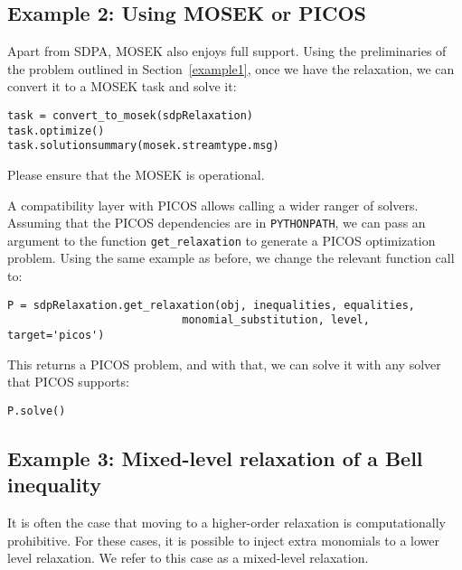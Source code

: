 \documentclass{article}
\begin{document}
\subsection{Example 2: Using MOSEK or PICOS}
Apart from SDPA, MOSEK also enjoys full support. Using the preliminaries of the problem outlined in Section~\ref{example1}, once we have the relaxation, we can convert it to a MOSEK task and solve it:

\begin{verbatim}
task = convert_to_mosek(sdpRelaxation)
task.optimize()
task.solutionsummary(mosek.streamtype.msg)
\end{verbatim}
Please ensure that the MOSEK is operational.

A compatibility layer with PICOS allows calling a wider ranger of solvers. Assuming that the PICOS dependencies are in \verb+PYTHONPATH+, we can pass an argument to the function \verb+get_relaxation+ to generate a PICOS optimization problem. Using the same example as before, we change the relevant function call to:
\begin{verbatim}
P = sdpRelaxation.get_relaxation(obj, inequalities, equalities,
                           monomial_substitution, level, target='picos')
\end{verbatim}
This returns a PICOS problem, and with that, we can solve it with any solver that PICOS supports:
\begin{verbatim}
P.solve()
\end{verbatim}

\subsection{Example 3: Mixed-level relaxation of a Bell inequality}\label{mixedlevel}
It is often the case that moving to a higher-order relaxation is computationally prohibitive. For these cases, it is possible to inject extra monomials to a lower level relaxation. We refer to this case as a mixed-level relaxation.
\end{document}
